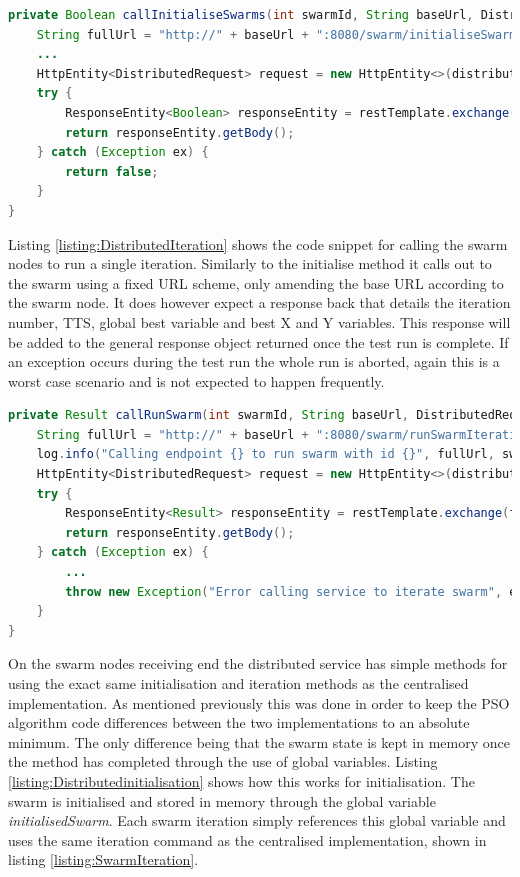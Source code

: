 \documentclass[oneside,12pt]{book}
\begin{document}
\begin{lstlisting}[basicstyle=\footnotesize, language=Java]
private Boolean callInitialiseSwarms(int swarmId, String baseUrl, DistributedRequest distributedRequest) {
    String fullUrl = "http://" + baseUrl + ":8080/swarm/initialiseSwarm";
    ...
    HttpEntity<DistributedRequest> request = new HttpEntity<>(distributedRequest);
    try {
        ResponseEntity<Boolean> responseEntity = restTemplate.exchange(fullUrl, HttpMethod.POST, request, Boolean.class);
        return responseEntity.getBody();
    } catch (Exception ex) {
        return false;
    }
}
\end{lstlisting}
\label{listing:DistributedInit}

Listing \ref{listing:DistributedIteration} shows the code snippet for calling the swarm nodes to run a single iteration. Similarly to the initialise method it calls out to the swarm using a fixed URL scheme, only amending the base URL according to the swarm node. It does however expect a response back that details the iteration number, TTS, global best variable and best X and Y variables. This response will be added to the general response object returned once the test run is complete. If an exception occurs during the test run the whole run is aborted, again this is a worst case scenario and is not expected to happen frequently. 

\begin{lstlisting}[basicstyle=\footnotesize, language=Java]
private Result callRunSwarm(int swarmId, String baseUrl, DistributedRequest distributedRequest) {
    String fullUrl = "http://" + baseUrl + ":8080/swarm/runSwarmIteration";
    log.info("Calling endpoint {} to run swarm with id {}", fullUrl, swarmId);
    HttpEntity<DistributedRequest> request = new HttpEntity<>(distributedRequest);
    try {
        ResponseEntity<Result> responseEntity = restTemplate.exchange(fullUrl, HttpMethod.POST, request, Result.class);
        return responseEntity.getBody();
    } catch (Exception ex) {
        ...
        throw new Exception("Error calling service to iterate swarm", ex);
    }
}
\end{lstlisting}
\label{listing:DistributedIteration}

On the swarm nodes receiving end the distributed service has simple methods for using the exact same initialisation and iteration methods as the centralised implementation. As mentioned previously this was done in order to keep the PSO algorithm code differences between the two implementations to an absolute minimum. The only difference being that the swarm state is kept in memory once the method has completed through the use of global variables. Listing \ref{listing:Distributedinitialisation} shows how this works for initialisation. The swarm is initialised and stored in memory through the global variable \textit{initialisedSwarm}. Each swarm iteration simply references this global variable and uses the same iteration command as the centralised implementation, shown in listing \ref{listing:SwarmIteration}.
\end{document}
